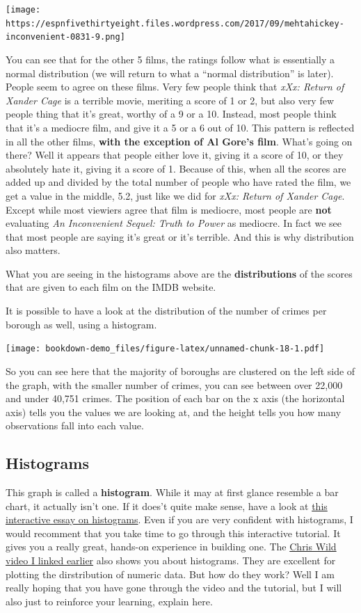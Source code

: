 \documentclass[]{book}
\theoremstyle{definition}
\theoremstyle{definition}
\theoremstyle{definition}
\theoremstyle{remark}
\begin{document}
\texttt{[image: https://espnfivethirtyeight.files.wordpress.com/2017/09/mehtahickey-inconvenient-0831-9.png]}

You can see that for the other 5 films, the ratings follow what is
essentially a normal distribution (we will return to what a ``normal
distribution'' is later). People seem to agree on these films. Very few
people think that \emph{xXx: Return of Xander Cage} is a terrible movie,
meriting a score of 1 or 2, but also very few people thing that it's
great, worthy of a 9 or a 10. Instead, most people think that it's a
mediocre film, and give it a 5 or a 6 out of 10. This pattern is
reflected in all the other films, \textbf{with the exception of Al
Gore's film}. What's going on there? Well it appears that people either
love it, giving it a score of 10, or they absolutely hate it, giving it
a score of 1. Because of this, when all the scores are added up and
divided by the total number of people who have rated the film, we get a
value in the middle, 5.2, just like we did for \emph{xXx: Return of
Xander Cage}. Except while most viewiers agree that film is mediocre,
most people are \textbf{not} evaluating \emph{An Inconvenient Sequel:
Truth to Power} as mediocre. In fact we see that most people are saying
it's great or it's terrible. And this is why distribution also matters.

What you are seeing in the histograms above are the
\textbf{distributions} of the scores that are given to each film on the
IMDB website.

It is possible to have a look at the distribution of the number of
crimes per borough as well, using a histogram.

\texttt{[image: bookdown-demo\_files/figure-latex/unnamed-chunk-18-1.pdf]}

So you can see here that the majority of boroughs are clustered on the
left side of the graph, with the smaller number of crimes, you can see
between over 22,000 and under 40,751 crimes. The position of each bar on
the x axis (the horizontal axis) tells you the values we are looking at,
and the height tells you how many observations fall into each value.

\hypertarget{histograms}{%
\subsection{Histograms}\label{histograms}}

This graph is called a \textbf{histogram}. While it may at first glance
resemble a bar chart, it actually isn't one. If it does't quite make
sense, have a look at \href{http://tinlizzie.org/histograms/}{this
interactive essay on histograms}. Even if you are very confident with
histograms, I would recomment that you take time to go through this
interactive tutorial. It gives you a really great, hands-on experience
in building one. The
\href{https://www.youtube.com/watch?v=U3lk2nQYfAQ\&amp=\&list=PL8CRAVedURQrlxeFfme0TEgaj1_h67JUR\&amp=\&index=4}{Chris
Wild video I linked earlier} also shows you about histograms. They are
excellent for plotting the dirstribution of numeric data. But how do
they work? Well I am really hoping that you have gone through the video
and the tutorial, but I will also just to reinforce your learning,
explain here.
\end{document}
